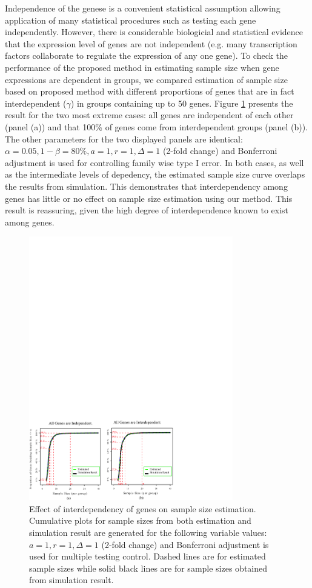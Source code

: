 \documentclass{bioinfo}
\begin{document}
Independence of the genese is a convenient statistical assumption
allowing application of many statistical procedures such as testing
each gene independently. However, there is considerable biologicial
and statistical evidence that the expression level of genes are not
independent (e.g. many transcription factors collaborate to regulate
the expression of any one gene). To check the performance of the
proposed method in estimating sample size when gene expressions are
dependent in groups, we compared estimation of sample size based on
proposed method with different proportions of genes that are in fact
interdependent ($\gamma$) in groups containing up to 50
genes. Figure \ref{fig:ResDep} presents the result for the two most
extreme cases: all genes are independent of each other (panel (a))
and that 100\% of genes come from interdependent groups (panel
(b)). The other parameters for the two displayed panels are
identical: $\alpha = 0.05, 1 - \beta = 80\%, a = 1, r = 1,
\Delta = 1$ (2-fold change) and Bonferroni adjustment is used for
controlling family wise type I error. In both cases, as well as the
intermediate levels of depedency, the estimated sample size curve
overlaps the results from simulation. This demonstrates that
interdependency among genes has little or no effect on sample size
estimation using our method. This result is reassuring, given the
high degree of interdependence known to exist among genes.

\begin{figure}[h]
  \centerline{\includegraphics*[width=3.5in]{ResDepF.pdf}}
  \caption[Effect of interdependency of genes on sample size estimation]
  {Effect of interdependency of genes on sample size estimation.
    Cumulative plots for sample sizes from both estimation and simulation result
    are generated for the following variable values: $a = 1, r = 1, \Delta = 1$ (2-fold
    change) and Bonferroni adjustment is used for multiple testing control. Dashed lines are for estimated sample sizes
    while solid black lines are for sample sizes obtained from simulation result.}
  \label{fig:ResDep}
\end{figure}
\end{document}
